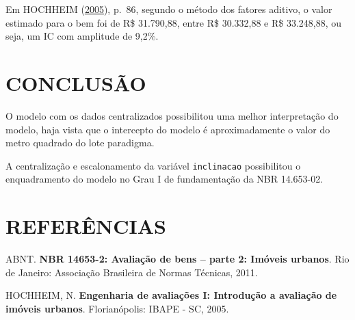 \documentclass[a4paper, 12pt]{article}
\begin{document}
Em HOCHHEIM (\protect\hyperlink{ref-hochheim2005}{2005}), p.~86, segundo
o método dos fatores aditivo, o valor estimado para o bem foi de R\$
31.790,88, entre R\$ 30.332,88 e R\$ 33.248,88, ou seja, um IC com
amplitude de 9,2\%.

\hypertarget{conclusao}{%
\section{CONCLUSÃO}\label{conclusao}}

O modelo com os dados centralizados possibilitou uma melhor
interpretação do modelo, haja vista que o intercepto do modelo é
aproximadamente o valor do metro quadrado do lote paradigma.

A centralização e escalonamento da variável \texttt{inclinacao}
possibilitou o enquadramento do modelo no Grau I de fundamentação da NBR
14.653-02.

\hypertarget{referencias}{%
\section*{REFERÊNCIAS}\label{referencias}}

\hypertarget{refs}{}
\leavevmode\hypertarget{ref-NBR1465302}{}%
ABNT. \textbf{NBR 14653-2: Avaliação de bens -- parte 2: Imóveis
urbanos}. Rio de Janeiro: Associação Brasileira de Normas Técnicas,
2011.

\leavevmode\hypertarget{ref-hochheim2005}{}%
HOCHHEIM, N. \textbf{Engenharia de avaliações I: Introdução a avaliação
de imóveis urbanos}. Florianópolis: IBAPE - SC, 2005.
\end{document}
